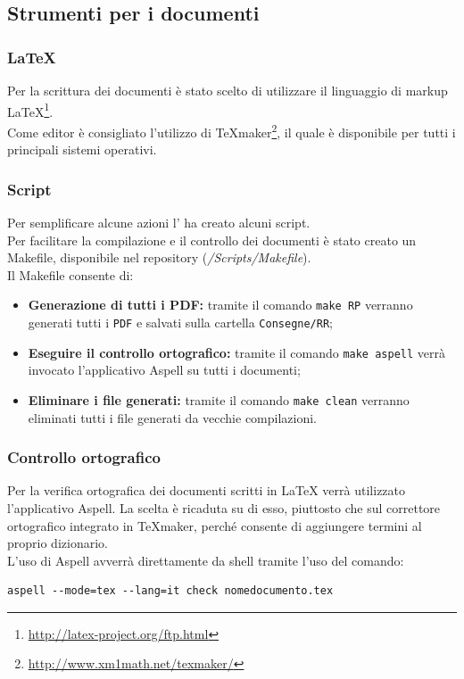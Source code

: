 \subsection{Strumenti per i documenti}
\label{ambdoc}

\subsubsection{\LaTeX}
\label{stesura}
Per la scrittura dei documenti è stato scelto di utilizzare il linguaggio di markup\glossario{} \LaTeX \footnote{\url{http://latex-project.org/ftp.html}}.
\\Come editor è consigliato l'utilizzo di \TeX maker\footnote{\url{http://www.xm1math.net/texmaker/}}, il quale è disponibile per tutti i principali sistemi operativi.

\subsubsection{Script}
\label{script}
Per semplificare alcune azioni l'\administrator{}  ha creato alcuni script.
\\Per facilitare la compilazione e il controllo dei documenti è stato creato un Makefile, disponibile nel repository\glossario{} (\textit{/Scripts/Makefile}).
\\Il Makefile consente di:
\begin{itemize}
\item \textbf{Generazione di tutti i PDF:} tramite il comando \verb!make RP! verranno generati tutti i \verb!PDF!\glossario{} e salvati sulla cartella \verb!Consegne/RR!;
\item \textbf{Eseguire il controllo ortografico:} tramite il comando \verb!make aspell! verrà invocato l'applicativo Aspell\glossario{} su tutti i documenti;
\item \textbf{Eliminare i file generati:} tramite il comando \verb!make clean! verranno eliminati tutti i file generati da vecchie compilazioni.
\end{itemize}

\subsubsection{Controllo ortografico}
\label{verortografica}
Per la verifica ortografica dei documenti scritti in \LaTeX{} verrà utilizzato l'applicativo Aspell\glossario{}. La scelta è ricaduta su di esso, piuttosto che sul correttore ortografico integrato in \TeX{}maker, perché consente di aggiungere termini al proprio dizionario.
\\L'uso di Aspell\glossario{} avverrà direttamente da shell tramite l'uso del comando:
\begin{verbatim}
aspell --mode=tex --lang=it check nomedocumento.tex
\end{verbatim}

